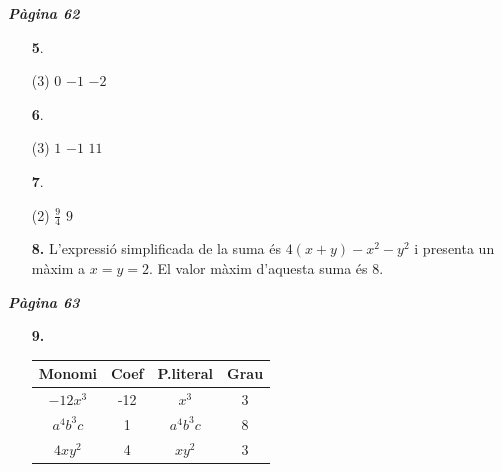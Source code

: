 \documentclass[a4paper, pdf, twoside]{book}
\begin{document}
\begin{multicols}{2}
{\textbf{\em Pàgina 62}} \hrulefill
\begin{enumerate}
\vspace{0.25cm}



 \item[\fontfamily{phv}\selectfont\color{blue}\textbf{5}. ] 
 \begin{tasks}[column-sep=1em, item-indent=1.3333em](3)
	 \task $0$
	 \task $-1$
	 \task $-2$
\end{tasks}
 \end{enumerate}
\begin{enumerate}
\vspace{0.25cm}



 \item[\fontfamily{phv}\selectfont\color{blue}\textbf{6}. ] 
 \begin{tasks}[column-sep=1em, item-indent=1.3333em](3)
	 \task $1$
	 \task $-1$
	 \task $11$
\end{tasks}
\vspace{0.25cm}



 \item[\fontfamily{phv}\selectfont\color{blue}\textbf{7}. ] 
 \begin{tasks}[column-sep=1em, item-indent=1.3333em](2)
	 \task $\frac {9}{4}$
	 \task $9$
\end{tasks}
\vspace{0.25cm}
\item[\fontfamily{phv}\selectfont\color{blue}\textbf{8. }] 
L'expressió simplificada de la suma és $4(x+y)-x^2-y^2$ i presenta un màxim a $x=y=2$. El valor màxim d'aquesta suma és 8.
 \end{enumerate}
\vspace{0.3cm}


{\textbf{\em Pàgina 63}} \hrulefill
\begin{enumerate}
\vspace{0.25cm}
\item[\fontfamily{phv}\selectfont\color{blue}\textbf{9. }] 
 \begin {tabular}{|c|c|c|c|} \hline \rowcolor {lightgray} Monomi & Coef & P.literal & Grau \\ \hline $-12x^{3} $ & -12 & $x^3$ & 3 \\ \hline $a^{4} b^{3} c$ & 1 & $a^{4} b^{3} c$ & 8 \\ \hline $4xy^{2} $ & 4 & $xy^2$ & 3 \\ \hline \end {tabular} 
 \end{enumerate}
\begin{enumerate}
\vspace{0.25cm}



\end{enumerate}
\end{multicols}
\end{document}
